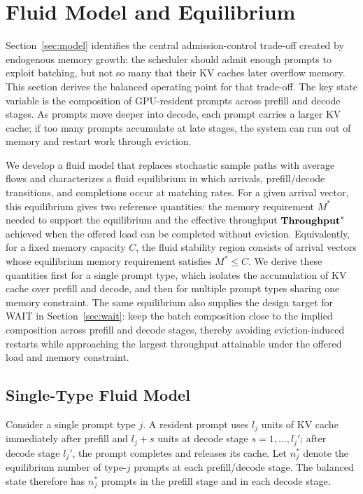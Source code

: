 \section{Fluid Model and Equilibrium}\label{sec:fluid}
Section~\ref{sec:model} identifies the central admission-control trade-off created by endogenous memory growth: the scheduler should admit enough prompts to exploit batching, but not so many that their KV caches later overflow memory. This section derives the balanced operating point for that trade-off. The key state variable is the composition of GPU-resident prompts across prefill and decode stages. As prompts move deeper into decode, each prompt carries a larger KV cache; if too many prompts accumulate at late stages, the system can run out of memory and restart work through eviction.

We develop a fluid model that replaces stochastic sample paths with average flows and characterizes a fluid equilibrium in which arrivals, prefill/decode transitions, and completions occur at matching rates. For a given arrival vector, this equilibrium gives two reference quantities: the memory requirement \(M^*\) needed to support the equilibrium and the effective throughput \(\textbf{Throughput}^*\) achieved when the offered load can be completed without eviction. Equivalently, for a fixed memory capacity \(C\), the fluid stability region consists of arrival vectors whose equilibrium memory requirement satisfies \(M^*\le C\). We derive these quantities first for a single prompt type, which isolates the accumulation of KV cache over prefill and decode, and then for multiple prompt types sharing one memory constraint. The same equilibrium also supplies the design target for WAIT in Section~\ref{sec:wait}: keep the batch composition close to the implied composition across prefill and decode stages, thereby avoiding eviction-induced restarts while approaching the largest throughput attainable under the offered load and memory constraint.

\subsection{Single-Type Fluid Model}
Consider a single prompt type \(j\). A resident prompt uses \(l_j\) units of KV cache immediately after prefill and \(l_j+s\) units at decode stage \(s=1,\dots,l_j'\); after decode stage \(l_j'\), the prompt completes and releases its cache. Let \(n_j^*\) denote the equilibrium number of type-\(j\) prompts at each prefill/decode stage. The balanced state therefore has \(n_j^*\) prompts in the prefill stage and in each decode stage.

